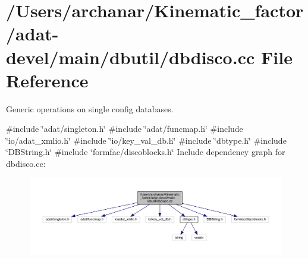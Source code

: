 \hypertarget{adat-devel_2main_2dbutil_2dbdisco_8cc}{}\section{/\+Users/archanar/\+Kinematic\+\_\+factor/adat-\/devel/main/dbutil/dbdisco.cc File Reference}
\label{adat-devel_2main_2dbutil_2dbdisco_8cc}


Generic operations on single config databases.  


{\ttfamily \#include \char`\"{}adat/singleton.\+h\char`\"{}}\newline
{\ttfamily \#include \char`\"{}adat/funcmap.\+h\char`\"{}}\newline
{\ttfamily \#include \char`\"{}io/adat\+\_\+xmlio.\+h\char`\"{}}\newline
{\ttfamily \#include \char`\"{}io/key\+\_\+val\+\_\+db.\+h\char`\"{}}\newline
{\ttfamily \#include \char`\"{}dbtype.\+h\char`\"{}}\newline
{\ttfamily \#include \char`\"{}D\+B\+String.\+h\char`\"{}}\newline
{\ttfamily \#include \char`\"{}formfac/discoblocks.\+h\char`\"{}}\newline
Include dependency graph for dbdisco.\+cc\+:
\nopagebreak
\begin{figure}[H]
\begin{center}
\leavevmode
\includegraphics[width=350pt]{d6/dd1/adat-devel_2main_2dbutil_2dbdisco_8cc__incl}
\end{center}
\end{figure}
